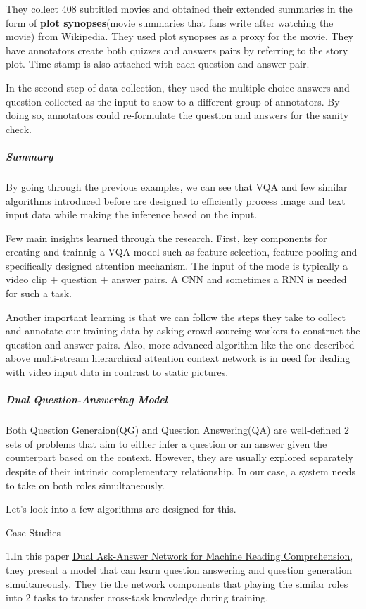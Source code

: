 \documentclass{acm_proc_article-sp}
\begin{document}
They collect 408 subtitled movies and obtained their extended summaries
in the form of \textbf{plot synopses}(movie summaries that fans write
after watching the movie) from Wikipedia. They used plot synopses as a
proxy for the movie. They have annotators create both quizzes and
answers pairs by referring to the story plot. Time-stamp is also
attached with each question and answer pair.

In the second step of data collection, they used the multiple-choice
answers and question collected as the input to show to a different group
of annotators. By doing so, annotators could re-formulate the question
and answers for the sanity check.

\subparagraph{Summary}\label{summary-1}

By going through the previous examples, we can see that VQA and few
similar algorithms introduced before are designed to efficiently process
image and text input data while making the inference based on the input.

Few main insights learned through the research. First, key components
for creating and trainnig a VQA model such as feature selection, feature
pooling and specifically designed attention mechanism. The input of the
mode is typically a video clip + question + answer pairs. A CNN and
sometimes a RNN is needed for such a task.

Another important learning is that we can follow the steps they take to
collect and annotate our training data by asking crowd-sourcing workers
to construct the question and answer pairs. Also, more advanced
algorithm like the one described above multi-stream hierarchical
attention context network is in need for dealing with video input data
in contrast to static pictures.

\subparagraph{Dual Question-Answering
Model}\label{dual-question-answering-model}

Both Question Generaion(QG) and Question Answering(QA) are well-defined
2 sets of problems that aim to either infer a question or an answer
given the counterpart based on the context. However, they are usually
explored separately despite of their intrinsic complementary
relationship. In our case, a system needs to take on both roles
simultaneously.

Let's look into a few algorithms are designed for this.

Case Studies

1.In this paper \href{https://arxiv.org/pdf/1809.01997.pdf}{Dual
Ask-Answer Network for Machine Reading Comprehension}, they present a
model that can learn question answering and question generation
simultaneously. They tie the network components that playing the similar
roles into 2 tasks to transfer cross-task knowledge during training.
\end{document}
